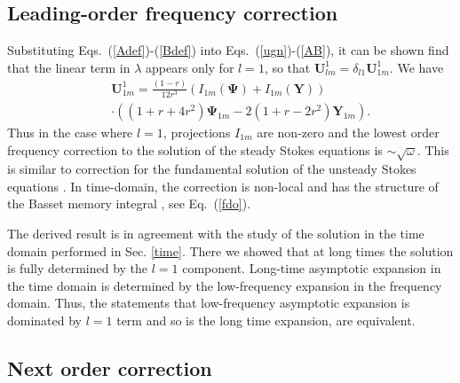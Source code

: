 \documentclass[aps,prx,twocolumn,amsmath,amssymb,amsfonts]{revtex4-2}
\begin{document}
{\subsection{Leading-order frequency correction}


Substituting Eqs.~(\ref{Adef})-(\ref{Bdef}) into Eqs.~(\ref{ugn})-(\ref{AB}), it can be shown
find that the linear term in $\lambda$ appears only for $l=1$, so that $\bm U^1_{lm}=\delta_{l1}\bm U^1_{1m}$. We have
\begin{eqnarray}&&\!\!\!\!\!
\bm U^1_{1m}=\frac{(1-r)}{12r^3}
( I_{1m}(\bm \Psi) + I_{1m}(\bm Y))
\nonumber\\&& \cdot
((1+r+4r^2)\bm \Psi_{1m}-2(1+r-2r^2)\bm Y_{1m}).
\label{lambda1a}
\end{eqnarray}
Thus in the case where $l=1$, projections $I_{1m}$ are non-zero and the lowest order frequency correction to the solution of the steady Stokes equations is $\sim \sqrt{\omega}$. This is similar to correction for the fundamental solution of the unsteady Stokes equations \cite{kim}. In time-domain, the correction is non-local and has the structure of the Basset memory integral \cite{kim}, see Eq.~(\ref{fdo}).

The derived result is in agreement with the study of the solution in the time domain performed in Sec. \ref{time}. There we showed that at long times the solution is fully determined by the $l=1$ component. Long-time asymptotic expansion in the time domain is determined by the low-frequency expansion in the frequency domain. Thus, the statements that low-frequency asymptotic expansion is dominated by $l=1$ term and so is the long time expansion, are equivalent.


\subsection{Next order correction}

}
\end{document}
